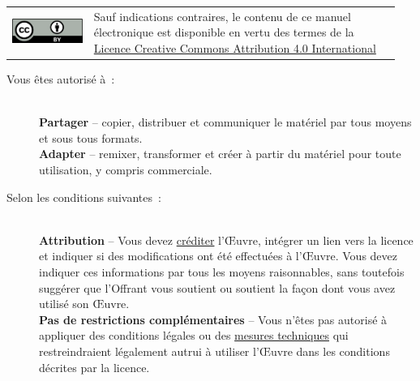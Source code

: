 \begin{tcolorbox}[
	colback=white, 
	colframe=black,
	toprule=1pt,
	bottomrule=1pt,
	leftrule=1pt,
	rightrule=1pt,
	before upper={\begin{minipage}[t]{\linewidth}},
    after upper={\end{minipage}},
]
\begin{tabular}{m{0.2\linewidth}m{0.75\linewidth}}
\includegraphics{images/CC/by.png} & 
Sauf indications contraires, le contenu de ce manuel électronique est disponible en vertu des termes de la \href{https://creativecommons.org/licenses/by/4.0/deed.fr}{Licence Creative Commons Attribution 4.0 International} \\
\end{tabular}
{\footnotesize
\begin{description}
  \item[Vous êtes autorisé à~:] ~\\
  \textbf{Partager} -- copier, distribuer et communiquer le matériel par tous moyens et sous tous formats.\\
  \textbf{Adapter} -- remixer, transformer et créer à partir du matériel pour toute utilisation, y compris commerciale.


\item[Selon les conditions suivantes~:] ~\\
  \textbf{Attribution} -- Vous devez \href{https://creativecommons.org/licenses/by/4.0/deed.fr\#}{créditer} l'Œuvre, intégrer un lien vers la licence et indiquer si des modifications ont été effectuées à l'Œuvre. Vous devez indiquer ces informations par tous les moyens raisonnables, sans toutefois suggérer que l'Offrant vous soutient ou soutient la façon dont vous avez utilisé son Œuvre.\\
  \textbf{Pas de restrictions complémentaires} -- Vous n'êtes pas autorisé à appliquer des conditions légales ou des \href{https://creativecommons.org/licenses/by/4.0/deed.fr\#}{mesures techniques} qui restreindraient légalement autrui à utiliser l'Œuvre dans les conditions décrites par la licence.
\end{description}
}
\end{tcolorbox}

